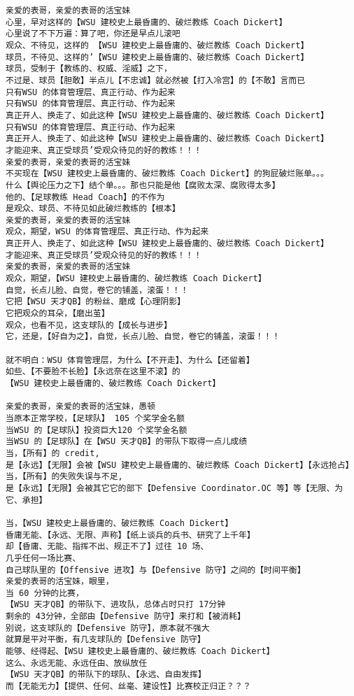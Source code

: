 \documentclass[9pt, b5paper]{article}
\begin{document}
\begin{verbatim}
亲爱的表哥，亲爱的表哥的活宝妹
心里，早对这样的【WSU 建校史上最昏庸的、破烂教练 Coach Dickert】
心里说了不下万遍：算了吧，你还是早点儿滚吧
观众、不待见，这样的 【WSU 建校史上最昏庸的、破烂教练 Coach Dickert】
球员，不待见、这样的’【WSU 建校史上最昏庸的、破烂教练 Coach Dickert】
球员，受制于【教练的、权威、淫威】之下，
不过是、球员【胆敢】半点儿【不忠诚】就必然被【打入冷宫】的【不敢】言而已
只有WSU 的体育管理层、真正行动、作为起来
只有WSU 的体育管理层、真正行动、作为起来
真正开人、换走了、如此这种【WSU 建校史上最昏庸的、破烂教练 Coach Dickert】
只有WSU 的体育管理层、真正行动、作为起来
真正开人、换走了、如此这种【WSU 建校史上最昏庸的、破烂教练 Coach Dickert】
才能迎来、真正受球员’受观众待见的好的教练！！！
亲爱的表哥，亲爱的表哥的活宝妹
不买现在【WSU 建校史上最昏庸的、破烂教练 Coach Dickert】的狗屁破烂账单。。。
什么【舆论压力之下】结个单。。。那也只能是他【腐败太深、腐败得太多】
他的、【足球教练 Head Coach】的不作为
是观众、球员、不待见如此破烂教练的【根本】
亲爱的表哥，亲爱的表哥的活宝妹
观众，期望，WSU 的体育管理层、真正行动、作为起来
真正开人、换走了、如此这种【WSU 建校史上最昏庸的、破烂教练 Coach Dickert】
才能迎来、真正受球员’受观众待见的好的教练！！！
亲爱的表哥，亲爱的表哥的活宝妹
观众，期望，【WSU 建校史上最昏庸的、破烂教练 Coach Dickert】
自觉，长点儿脸、自觉，卷它的铺盖，滚蛋！！！
它把【WSU 天才QB】的粉丝、磨成【心理阴影】
它把观众的耳朵，【磨出茧】
观众，也看不见，这支球队的【成长与进步】
它，还是，【好自为之】，自觉，长点儿脸、自觉，卷它的铺盖，滚蛋！！！

就不明白：WSU 体育管理层，为什么【不开走】、为什么【还留着】
如些、【不要脸不长脸】【永远奈在这里不滚】的
【WSU 建校史上最昏庸的、破烂教练 Coach Dickert】

亲爱的表哥，亲爱的表哥的活宝妹，愚顿
当原本正常学校，【足球队】 105 个奖学金名额
当WSU 的【足球队】投资巨大120 个奖学金名额
当WSU 的【足球队】在【WSU 天才QB】的带队下取得一点儿成绩
当，【所有】的 credit,
是【永远】【无限】会被【WSU 建校史上最昏庸的、破烂教练 Coach Dickert】【永远抢占】
当，【所有】的失败失误与不足,
是【永远】【无限】会被其它它的部下【Defensive Coordinator.OC 等】等【无限、为它、承担】

当，【WSU 建校史上最昏庸的、破烂教练 Coach Dickert】
昏庸无能、【永远、无限、声称】【纸上谈兵的兵书、研究了上千年】
却【昏庸、无能、指挥不出、规正不了】过往 10 场、
几乎任何一场比赛、
自己球队里的【Offensive 进攻】与【Defensive 防守】之间的【时间平衡】
亲爱的表哥的活宝妹，眼里，
当 60 分钟的比赛，
【WSU 天才QB】的带队下、进攻队，总体占时只打 17分钟
剩余的 43分钟，全部由【Defensive 防守】来打和【被消耗】
别说，这支球队的【Defensive 防守】，原本就不强大
就算是平对平衡，有几支球队的【Defensive 防守】
能够、经得起、【WSU 建校史上最昏庸的、破烂教练 Coach Dickert】
这么、永远无能、永远任由、放纵放任
【WSU 天才QB】的带队下的球队、【永远、自由发挥】
而【无能无力】【提供、任何、丝毫、建设性】比赛校正归正？？？


\end{verbatim}
\end{document}
